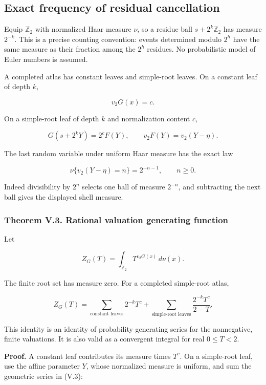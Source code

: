 \documentclass[11pt,letterpaper]{article}
\begin{document}
\subsection{Exact frequency of residual cancellation}\label{exact-frequency-of-residual-cancellation}

Equip \(\mathbb Z_2\) with normalized Haar measure \(\nu\), so a residue ball \(s+2^k\mathbb Z_2\) has measure \(2^{-k}\). This is a precise counting convention: events determined modulo \(2^h\) have the same measure as their fraction among the \(2^h\) residues. No probabilistic model of Euler numbers is assumed.

A completed atlas has constant leaves and simple-root leaves. On a constant leaf of depth \(k\),

\[
v_2G(x)=c.
\]

On a simple-root leaf of depth \(k\) and normalization content \(c\),

\[
G(s+2^kY)=2^cF(Y),\qquad
v_2F(Y)=v_2(Y-\eta).
\]

The last random variable under uniform Haar measure has the exact law

\[
\nu\{v_2(Y-\eta)=n\}=2^{-n-1},\qquad n\ge0. \tag{V.3}
\]

Indeed divisibility by \(2^n\) selects one ball of measure \(2^{-n}\), and subtracting the next ball gives the displayed shell measure.

\subsubsection{Theorem V.3. Rational valuation generating function}\label{theorem-v.3.-rational-valuation-generating-function}

Let

\[
Z_G(T)=\int_{\mathbb Z_2}T^{v_2G(x)}\,d\nu(x).
\]

The finite root set has measure zero. For a completed simple-root atlas,

\[
\boxed{
 Z_G(T)=
 \sum_{\text{constant leaves}}2^{-k}T^c
 +\sum_{\text{simple-root leaves}}
 \frac{2^{-k}T^c}{2-T}.
} \tag{V.4}
\]

This identity is an identity of probability generating series for the nonnegative, finite valuations. It is also valid as a convergent integral for real \(0\le T<2\).

\textbf{Proof.} A constant leaf contributes its measure times \(T^c\). On a simple-root leaf, use the affine parameter \(Y\), whose normalized measure is uniform, and sum the geometric series in (V.3):
\end{document}
